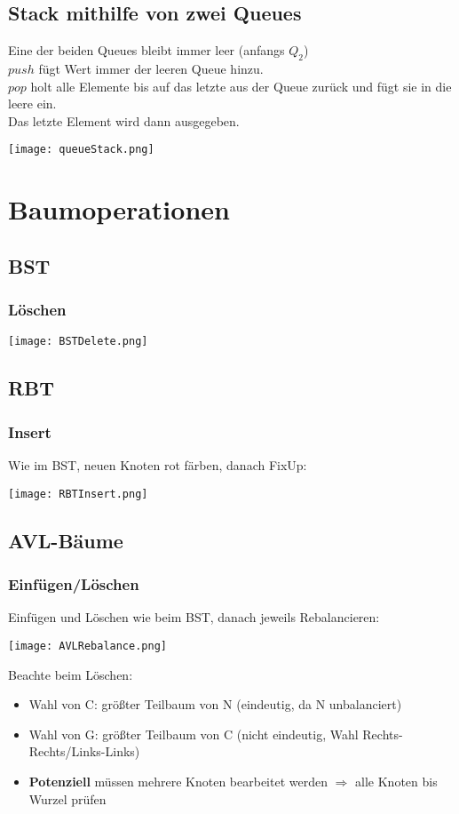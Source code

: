 \subsection*{Stack mithilfe von zwei Queues}

Eine der beiden Queues bleibt immer leer (anfangs $Q_2$) \\
$push$ fügt Wert immer der leeren Queue hinzu. \\
$pop$ holt alle Elemente bis auf das letzte aus der Queue zurück und fügt sie in die leere ein. \\
Das letzte Element wird dann ausgegeben. \\
\centerline{\texttt{[image: queueStack.png]}}

\pagebreak

\section*{Baumoperationen}

\subsection*{BST}
\subsubsection*{Löschen}
\centerline{\texttt{[image: BSTDelete.png]}}

\subsection*{RBT}
\subsubsection*{Insert}
\centerline{Wie im BST, neuen Knoten rot färben, danach FixUp:}
\centerline{\texttt{[image: RBTInsert.png]}}

\subsection*{AVL-Bäume}
\subsubsection*{Einfügen/Löschen}
\centerline{Einfügen und Löschen wie beim BST, danach jeweils Rebalancieren:}
\centerline{\texttt{[image: AVLRebalance.png]}}
Beachte beim Löschen: 
    \begin{itemize}
        \item Wahl von C: größter Teilbaum von N (eindeutig, da N unbalanciert)
        \item Wahl von G: größter Teilbaum von C (nicht eindeutig, Wahl Rechts-Rechts/Links-Links)
        \item \textbf{Potenziell} müssen mehrere Knoten bearbeitet werden $\Rightarrow$ alle Knoten bis Wurzel prüfen
    \end{itemize}

